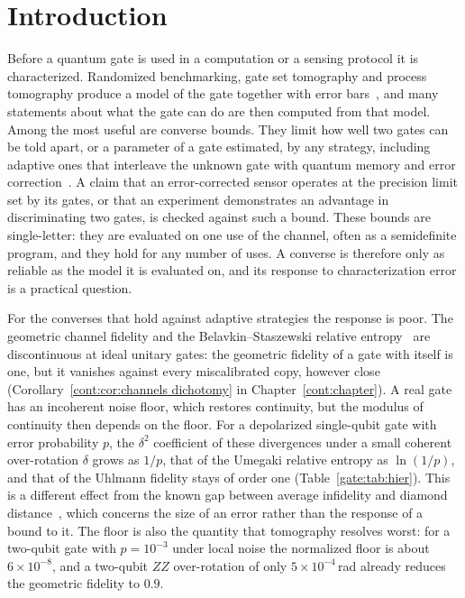 \section{Introduction}\label{gate:sec:intro}

Before a quantum gate is used in a computation or a sensing protocol it is characterized. Randomized benchmarking, gate set tomography and process tomography produce a model of the gate together with error bars~\cite{Eisert2020,KlieschRoth2021,BlumeKohout2017}, and many statements about what the gate can do are then computed from that model. Among the most useful are converse bounds. They limit how well two gates can be told apart, or a parameter of a gate estimated, by any strategy, including adaptive ones that interleave the unknown gate with quantum memory and error correction~\cite{Hayashi2009,HHLW2010,Pirandola2019,KatariyaWilde2021,FangFawzi2021,ZhouJiang2021}. 
A claim that an error-corrected sensor operates at the precision limit set by its gates, or that an experiment demonstrates an advantage in discriminating two gates, is checked against such a bound. These bounds are single-letter: they are evaluated on one use of the channel, often as a semidefinite program, and they hold for any number of uses. A converse is therefore only as reliable as the model it is evaluated on, and its response to characterization error is a practical question.

For the converses that hold against adaptive strategies the response is poor. The geometric channel fidelity and the Belavkin--Staszewski relative entropy~\cite{BelavkinStaszewski1982,Matsumoto2018newf,FangFawzi2021,KatariyaWilde2021} are discontinuous at ideal unitary gates: the geometric fidelity of a gate with itself is one, but it vanishes against every miscalibrated copy, however close (Corollary~\ref{cont:cor:channels dichotomy} in Chapter~\ref{cont:chapter}). A real gate has an incoherent noise floor, which restores continuity, but the modulus of continuity then depends on the floor. For a depolarized single-qubit gate with error probability $p$, the $\delta^2$ coefficient of these divergences under a small coherent over-rotation $\delta$ grows as $1/p$, that of the Umegaki relative entropy as $\ln(1/p)$, and that of the Uhlmann fidelity stays of order one (Table~\ref{gate:tab:hier}). This is a different effect from the known gap between average infidelity and diamond distance~\cite{KuengLongDohertyFlammia2016}, which concerns the size of an error rather than the response of a bound to it. The floor is also the quantity that tomography resolves worst: for a two-qubit gate with $p=10^{-3}$ under local noise the normalized floor is about $6\times10^{-8}$, and a two-qubit $ZZ$ over-rotation of only $5\times10^{-4}$\,rad already reduces the geometric fidelity to $0.9$.

